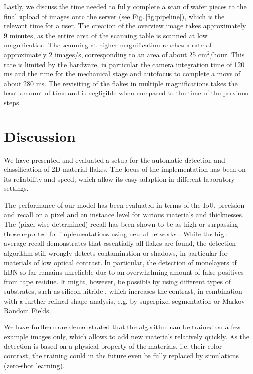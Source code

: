 \documentclass[reprint, prl, superscriptaddress, floatfix]{revtex4-2}
\newcommand{\fig}[1]{Fig.\,\ref{#1}}
\begin{document}
Lastly, we discuss the time needed to fully complete a scan of wafer pieces to the final upload of images onto the server (see \fig{fig:pipeline}), which is the relevant time for a user.
The creation of the overview image takes approximately 9 minutes, as the entire area of the scanning table is scanned at low magnification. 
The scanning at higher magnification reaches a rate of approximately 2 images/s, corresponding to an area of about 25 cm$^2$/hour. %
This rate is limited by the hardware, in particular the camera integration time of 120 ms and the time for the mechanical stage and autofocus to complete a move of about 280 ms.
The revisiting of the flakes in multiple magnifications takes the least amount of time and is negligible when compared to the time of the previous steps.


\section{Discussion}

We have presented and evaluated a setup for the automatic detection and classification of 2D material flakes.
The focus of the implementation has been on its reliability and speed, which allow its easy adaption in different laboratory settings.
 
The performance of our model has been evaluated in terms of the IoU, precision and recall on a pixel and an instance level for various materials and thicknesses. 
The (pixel-wise determined) recall has been shown to be as high or surpassing those reported for implementations using neural networks \cite{Han2020Jul, Yang2022Aug, Siao2021}. 
While the high average recall demonstrates that essentially all flakes are found, the detection algorithm still wrongly detects contamination or shadows, in particular for materials of low optical contrast. 
In particular, the detection of monolayers of hBN so far remains unreliable due to an overwhelming amount of false positives from tape residue.  
It might, however, be possible by using different types of substrates, such as silicon nitride \cite{Hattori2022}, which increases the contrast, in combination with a further refined shape analysis, e.g. by superpixel segmentation or Markov Random Fields. 

We have furthermore demonstrated that the algorithm can be trained on a few example images only, which allows to add new materials relatively quickly.  
As the detection is based on a physical property of the materials, i.e. their color contrast, the training could in the future even be fully replaced by simulations (zero-shot learning). 
\end{document}
